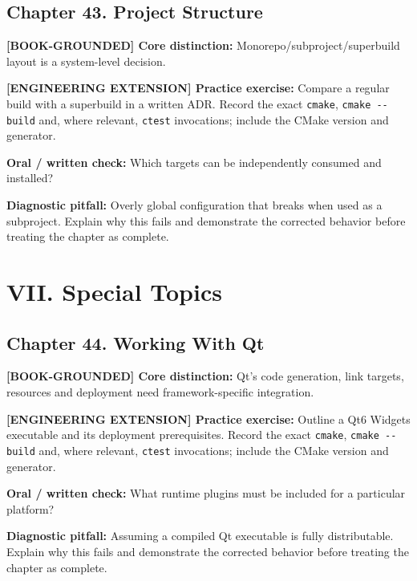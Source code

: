 \documentclass[11pt,letterpaper,oneside]{report}
\providecommand{\passthrough}[1]{#1}
\begin{document}
\section{Chapter 43. Project
Structure}\label{chapter-43.-project-structure}

\textbf{{[}BOOK-GROUNDED{]} Core distinction:}
Monorepo/subproject/superbuild layout is a system-level decision.

\textbf{{[}ENGINEERING EXTENSION{]} Practice exercise:} Compare a
regular build with a superbuild in a written ADR. Record the exact
\passthrough{\lstinline!cmake!}, \passthrough{\lstinline!cmake --build!}
and, where relevant, \passthrough{\lstinline!ctest!} invocations;
include the CMake version and generator.

\textbf{Oral / written check:} Which targets can be independently
consumed and installed?

\textbf{Diagnostic pitfall:} Overly global configuration that breaks
when used as a subproject. Explain why this fails and demonstrate the
corrected behavior before treating the chapter as complete.

\chapter{VII. Special Topics}\label{vii.-special-topics}

\section{Chapter 44. Working With Qt}\label{chapter-44.-working-with-qt}

\textbf{{[}BOOK-GROUNDED{]} Core distinction:} Qt's code generation,
link targets, resources and deployment need framework-specific
integration.

\textbf{{[}ENGINEERING EXTENSION{]} Practice exercise:} Outline a Qt6
Widgets executable and its deployment prerequisites. Record the exact
\passthrough{\lstinline!cmake!}, \passthrough{\lstinline!cmake --build!}
and, where relevant, \passthrough{\lstinline!ctest!} invocations;
include the CMake version and generator.

\textbf{Oral / written check:} What runtime plugins must be included for
a particular platform?

\textbf{Diagnostic pitfall:} Assuming a compiled Qt executable is fully
distributable. Explain why this fails and demonstrate the corrected
behavior before treating the chapter as complete.
\end{document}
